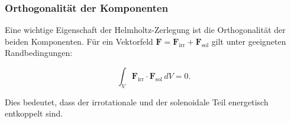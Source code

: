 \subsubsection{Orthogonalität der Komponenten}

Eine wichtige Eigenschaft der Helmholtz-Zerlegung ist die Orthogonalität der beiden Komponenten. Für ein Vektorfeld $\mathbf{F} = \mathbf{F}_{\text{irr}} + \mathbf{F}_{\text{sol}}$ gilt unter geeigneten Randbedingungen:

\begin{equation}
\int_V \mathbf{F}_{\text{irr}} \cdot \mathbf{F}_{\text{sol}} \, dV = 0.
\end{equation}

Dies bedeutet, dass der irrotationale und der solenoidale Teil energetisch entkoppelt sind.


